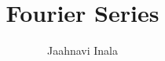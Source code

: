 \documentclass[journal,12pt,twocolumn]{IEEEtran}
\begin{document}
\let\StandardTheFigure\thefigure
\renewcommand{\thefigure}{\theproblem}



\def\putbox#1#2#3{\makebox[0in][l]{\makebox[#1][l]{}\raisebox{\baselineskip}[0in][0in]{\raisebox{#2}[0in][0in]{#3}}}}
     \def\rightbox#1{\makebox[0in][r]{#1}}
     \def\centbox#1{\makebox[0in]{#1}}
     \def\topbox#1{\raisebox{-\baselineskip}[0in][0in]{#1}}
     \def\midbox#1{\raisebox{-0.5\baselineskip}[0in][0in]{#1}}

\vspace{3cm}

\title{ 
Fourier Series
}


%
%
%

\author{ Jaahnavi Inala } %

% 
%
\end{document}
